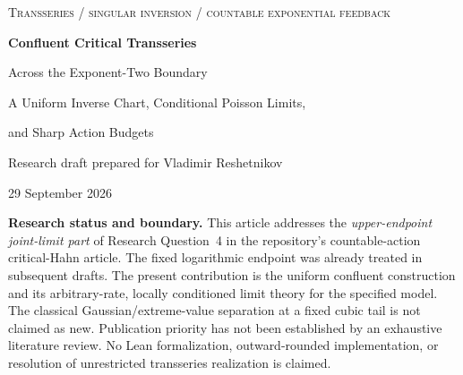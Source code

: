 \documentclass[11pt,a4paper]{article}
\numberwithin{equation}{section}
\theoremstyle{definition}
\theoremstyle{remark}
\newcommand{\eps}{\varepsilon}
\begin{document}
\begin{center}
{\small\scshape Transseries / singular inversion / countable exponential feedback}\par
\vspace{12pt}
{\LARGE\bfseries Confluent Critical Transseries}\par
\vspace{7pt}
{\Large Across the Exponent-Two Boundary}\par
\vspace{9pt}
{\large A Uniform Inverse Chart, Conditional Poisson Limits,\par and Sharp Action Budgets}\par
\vspace{14pt}
{\normalsize Research draft prepared for Vladimir Reshetnikov}\par
{\small 29 September 2026}
\end{center}
\vspace{6pt}
\begin{abstract}
We study the positive feedback equation
\[
 U_\eps(q)=c_\eps\sum_{j\ge1}j^{-3+\eps}q^j e^{jU_\eps(q)},
 \qquad c_\eps=\zeta(2-\eps)^{-1},
\]
in the joint limit in which the coefficient order tends to infinity and
\(\eps\to0\), from either side and at an arbitrary rate. A cancellation-free
normal form yields a single convergent three-variable inverse chart over an
exact implicit core. At \(\eps=0\) this core is a Lambert--\(W_{-1}\) core;
its two outer limits recover fractional-power and finite-variance inversion.
We prove a triangular local Gaussian theorem, stable under arbitrary thinning
above the extreme-action scale. It gives a multiplicative equivalent for the
sector coefficients and a conditional Poisson point-process limit even under
exact lattice conditioning. The fluctuation scale \(B_n\) and extreme scale
\(A_n\) satisfy \(A_n/B_n\to0\) for every \(\eps_n\to0\), while the sharp
retained-coefficient fraction at cutoff \(M\sim sA_n\) is
\(\exp(-1/(2s^2))\). Explicit crossover factors describe the window
\(\eps_n\log n=O(1)\). An exact identity between the inverse core and the
probabilistic normalization connects the two constructions. Complete proofs,
finite real inequalities, exact algebraic checks, and reproducible numerical
diagnostics are included.
\end{abstract}

\noindent\textbf{Research status and boundary.}
This article addresses the \emph{upper-endpoint joint-limit part} of Research
Question~4 in the repository's countable-action critical-Hahn article. The
fixed logarithmic endpoint was already treated in subsequent drafts. The
present contribution is the uniform confluent construction and its
arbitrary-rate, locally conditioned limit theory for the specified model.
The classical Gaussian/extreme-value separation at a fixed cubic tail is not
claimed as new. Publication priority has not been established by an exhaustive
literature review. No Lean formalization, outward-rounded implementation, or
resolution of unrestricted transseries realization is claimed.
\end{document}
